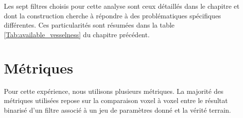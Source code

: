 Les sept filtres choisis pour cette analyse sont ceux détaillés dans le chapitre \chapSOTAN{} et dont la construction cherche à répondre à des problématiques spécifiques différentes. Ces particularités sont résumées dans la table \ref{Tab:available_vesselness} du chapitre précédent. 


\section{Métriques}

Pour cette expérience, nous utilisons plusieurs métriques. La majorité des métriques utilisées repose sur la comparaison voxel à voxel entre le résultat binarisé d'un filtre associé à un jeu de paramètres donné et la vérité terrain.

